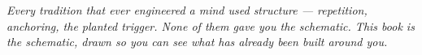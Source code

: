 \thispagestyle{empty}
\vspace*{2.6in}
\begin{center}
\begin{minipage}{0.74\textwidth}
\itshape\centering
Every tradition that ever engineered a mind used structure --- repetition,
anchoring, the planted trigger. None of them gave you the schematic. This
book is the schematic, drawn so you can see what has already been built
around you.
\end{minipage}
\end{center}
\clearpage

{%
  \hypersetup{linkcolor=black}%
  \tableofcontents*
}
\clearpage

{%
  \hypersetup{linkcolor=black}%
  \listoffigures
}
\clearpage


